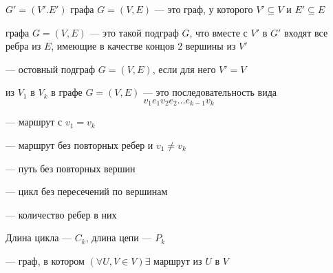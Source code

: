 \begin{definition}
	 $G'= (V'. E')$ графа $G = (V,E)$ --- это граф, у которого $V' \subseteq V$ и $E' \subseteq E$ 
\end{definition}

\begin{definition}
	 графа $G = (V, E)$ --- это такой подграф $G$, что вместе
	с $V'$ в $G'$ входят все ребра из $E$, имеющие в качестве концов 2 вершины из $V'$
\end{definition}

\begin{definition}
	 --- остовный подграф $G = (V,E)$, если для него $V' = V$ 
\end{definition}

\begin{definition}
	 из $V_1$ в $V_{k}$ в графе $G = (V,E)$ --- это последовательность вида
	\[
	v_1 e_1 v_2 e_2 \ldots e_{k-1} v_{k}
	\] 
\end{definition}

\begin{definition}
	  --- маршрут с $v_1 = v_{k}$
\end{definition}

\begin{definition}
	 --- маршрут без повторных ребер и $v_1 \neq v_{k}$ 
\end{definition}

\begin{definition}
	 --- путь без повторных вершин
\end{definition}

\begin{definition}
	 --- цикл без пересечений по вершинам
\end{definition}

\begin{definition}
	 --- количество ребер в них 
\end{definition}

\begin{remark}
	Длина цикла --- $C_{k}$, длина цепи --- $P_{k}$
\end{remark}

\begin{definition}
	 --- граф, в котором $ \left(\forall U,V \in V\right) \exists $ маршрут из $U$ в $V$ 
\end{definition}

